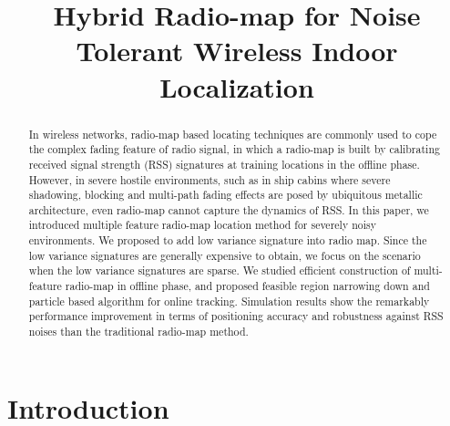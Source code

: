 \documentclass[conference, 10pt]{IEEEtran}
\begin{document}
\title{Hybrid Radio-map for Noise Tolerant Wireless Indoor Localization}




\author{
}









\maketitle


\begin{abstract}
In wireless networks, radio-map based locating techniques are commonly used to cope the complex fading feature of radio signal, in which a radio-map is built by calibrating received signal strength (RSS) signatures at training locations in the offline phase. However, in severe hostile environments, such as in ship cabins where severe shadowing, blocking and multi-path fading effects are posed by ubiquitous metallic architecture, even radio-map cannot capture the dynamics of RSS. In this paper, we introduced multiple feature radio-map location method for severely noisy environments. We proposed to add low variance signature into radio map. Since the low variance signatures are generally expensive to obtain, we focus on the scenario when the low variance signatures are sparse. We studied efficient construction of multi-feature radio-map in offline phase, and proposed feasible region narrowing down and particle based algorithm for online tracking. Simulation results show the remarkably performance improvement in terms of positioning accuracy and robustness against RSS noises than the traditional radio-map method. 
\end{abstract}

\IEEEpeerreviewmaketitle



\section{Introduction}
\end{document}
